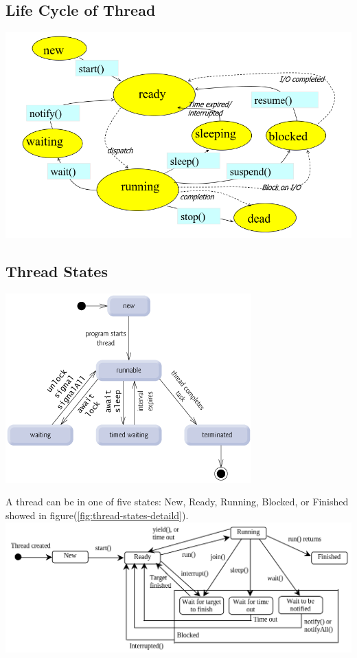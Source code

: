 \documentclass[12pt, a4paper]{book}
\begin{document}
\subsection{Life Cycle of Thread}
\includegraphics[width=0.9\linewidth]{figures/Life-cycle-of-Java-threads.png}
\subsection{Thread States}
\includegraphics[width=0.9\linewidth]{figures/thread-states.png}

A thread can be in one of five states: New, Ready, Running, Blocked, or Finished showed in figure(\ref{fig:thread-states-detaild}).\\
\includegraphics[width=0.9\linewidth]{figures/thread-states-detaild.png}
\label{fig:thread-states-detaild}
\end{document}
